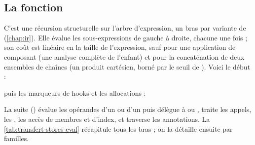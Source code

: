 \subsection{La fonction }

C'est une récursion structurelle sur l'arbre d'expression, un bras par
variante de  (\cref{chap:ir}). Elle évalue les sous-expressions
de gauche à droite, chacune une fois ; son coût est linéaire en la taille de
l'expression, sauf pour une application de composant (une analyse complète
de l'enfant) et pour la concaténation de deux ensembles de chaînes (un
produit cartésien, borné par le seuil de ). Voici le début :


puis les marqueurs de hooks et les allocations :


La suite () évalue les
opérandes d'un  ou d'un  puis délègue à
 ou , traite les appels, les ,
les accès de membres et d'index, et traverse les annotations. La
\cref{tab:transfert-stores-eval} récapitule tous les bras ; on la détaille
ensuite par familles.

